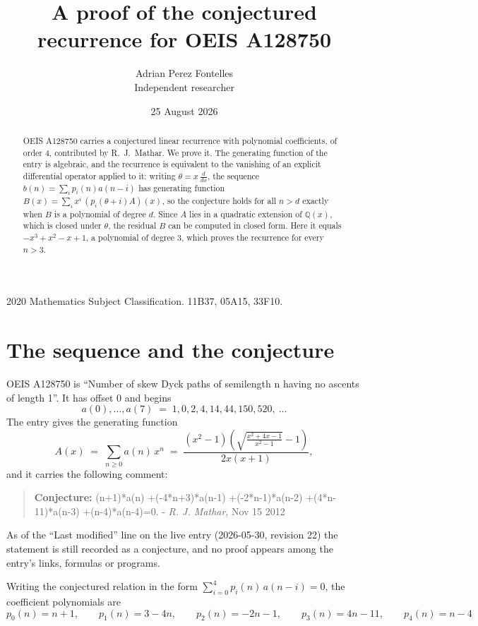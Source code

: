 \documentclass[11pt,a4paper]{article}
\title{A proof of the conjectured recurrence for OEIS A128750}
\author{Adrian Perez Fontelles\\ \small Independent researcher}
\date{25 August 2026}
\theoremstyle{plain}
\theoremstyle{definition}
\begin{document}
\maketitle

\begin{abstract}
OEIS A128750 carries a conjectured linear recurrence with polynomial coefficients, of
order 4, contributed by R.~J.~Mathar. We prove it. The generating function of the
entry is algebraic, and the recurrence is equivalent to the vanishing of an explicit
differential operator applied to it: writing $\theta=x\,\frac{d}{dx}$, the sequence
$b(n)=\sum_{i}p_{i}(n)a(n-i)$ has generating function
$B(x)=\sum_{i}x^{i}\,(p_{i}(\theta+i)A)(x)$, so the conjecture holds for all $n>d$ exactly
when $B$ is a polynomial of degree $d$. Since $A$ lies in a quadratic extension of
$\mathbb{Q}(x)$, which is closed under $\theta$, the residual $B$ can be computed in
closed form. Here it equals $- x^{3} + x^{2} - x + 1$, a polynomial of degree $3$, which proves
the recurrence for every $n>3$.
\end{abstract}

\noindent\small 2020 Mathematics Subject Classification. 11B37, 05A15, 33F10.\normalsize

\section{The sequence and the conjecture}

OEIS A128750 is ``Number of skew Dyck paths of semilength n having no ascents of length 1''. It has offset $0$ and begins
\[
a(0),\dots,a(7)\;=\;1, 0, 2, 4, 14, 44, 150, 520,\ \dots
\]
The entry gives the generating function
\begin{equation}\label{eq:gf}
A(x)\;=\;\sum_{n\ge 0} a(n)\,x^{n}\;=\;\frac{\left(x^{2} - 1\right) \left(\sqrt{\frac{x^{2} + 4 x - 1}{x^{2} - 1}} - 1\right)}{2 x \left(x + 1\right)} ,
\end{equation}
and it carries the following comment:
\begin{quote}\small
\textbf{Conjecture:} (n+1)*a(n) +(-4*n+3)*a(n-1) +(-2*n-1)*a(n-2) +(4*n-11)*a(n-3) +(n-4)*a(n-4)=0. - \emph{R. J. Mathar}, Nov 15 2012
\end{quote}
As of the ``Last modified'' line on the live entry (2026-05-30, revision 22) the
statement is still recorded as a conjecture, and no proof appears among the entry's links,
formulas or programs.

Writing the conjectured relation in the form $\sum_{i=0}^{4}p_{i}(n)\,a(n-i)=0$,
the coefficient polynomials are
\[
p_{0}(n)=n + 1,\qquad p_{1}(n)=3 - 4 n,\qquad p_{2}(n)=- 2 n - 1,\qquad p_{3}(n)=4 n - 11,\qquad p_{4}(n)=n - 4
\]
\end{document}
